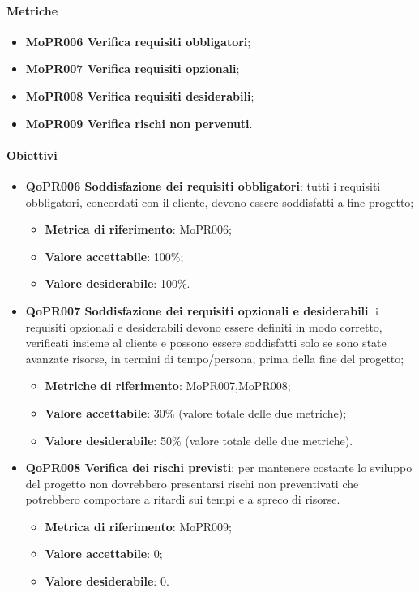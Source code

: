 \documentclass[../piano-di-qualifica.tex]{subfiles}
\begin{document}
\paragraph{Metriche}
\label{sub:metriche_2}
\begin{itemize}
    \item \textbf{MoPR006 Verifica requisiti obbligatori};
    \item \textbf{MoPR007 Verifica requisiti opzionali};
    \item \textbf{MoPR008 Verifica requisiti desiderabili};
    \item \textbf{MoPR009 Verifica rischi non pervenuti}.
\end{itemize}

\paragraph{Obiettivi}
\label{sub:obiettivi_2}
\begin{itemize}
    \item \textbf{QoPR006 Soddisfazione dei requisiti obbligatori}: tutti i requisiti obbligatori, concordati con il cliente, devono essere soddisfatti a fine progetto;
        \begin{itemize}
            \item \textbf{Metrica di riferimento}: MoPR006;
            \item \textbf{Valore accettabile}: 100\%; %
            \item \textbf{Valore desiderabile}: 100\%.
        \end{itemize}
    \item \textbf{QoPR007 Soddisfazione dei requisiti opzionali e desiderabili}: i requisiti opzionali e desiderabili devono essere definiti in modo corretto, verificati insieme al cliente e possono essere soddisfatti solo se sono state avanzate risorse, in termini di tempo/persona, prima della fine del progetto;
        \begin{itemize}
            \item \textbf{Metriche di riferimento}: MoPR007,MoPR008;
            \item \textbf{Valore accettabile}: 30\% (valore totale delle due metriche); %
            \item \textbf{Valore desiderabile}: 50\% (valore totale delle due metriche).
        \end{itemize}
    \item \textbf{QoPR008 Verifica dei rischi previsti}: per mantenere costante lo sviluppo del progetto non dovrebbero presentarsi rischi non preventivati che potrebbero comportare a ritardi sui tempi e a spreco di risorse.
        \begin{itemize}
            \item \textbf{Metrica di riferimento}: MoPR009;
            \item \textbf{Valore accettabile}: 0; %
            \item \textbf{Valore desiderabile}: 0.
        \end{itemize}
\end{itemize}
\end{document}

